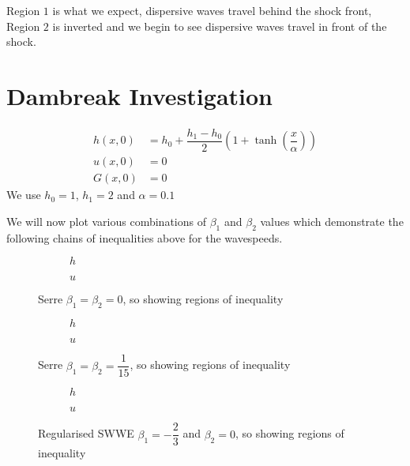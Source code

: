 \documentclass[10pt]{article}
\begin{document}
Region $1$ is what we expect, dispersive waves travel behind the shock front, Region $2$ is inverted and we begin to see dispersive waves travel in front of the shock. 




\section{Dambreak Investigation}


\begin{align}
h(x,0) & = h_0 + \dfrac{h_1 - h_0}{2} \left(1 + \tanh\left(\dfrac{x}{\alpha}\right)\right)  \\
u(x,0) &= 0 \\
G(x,0) &= 0
\end{align}
We use $h_0 = 1$, $h_1 = 2$ and $\alpha = 0.1$

We will now plot various combinations of $\beta_1$ and $\beta_2$ values which demonstrate the following chains of inequalities above for the wavespeeds. 

 
\begin{figure}
	\centering
	\begin{subfigure}{0.49\textwidth}
		\centering
		
		\caption{$h$}
	\end{subfigure}
	\begin{subfigure}{0.49\textwidth}
		\centering
		
		\caption{$u$}
	\end{subfigure}
	\caption{ Serre $\beta_1 = \beta_2 = 0$, so  showing regions of inequality}
\end{figure}

\begin{figure}
	\centering
	\begin{subfigure}{0.49\textwidth}
		\centering
		
		\caption{$h$}
	\end{subfigure}
	\begin{subfigure}{0.49\textwidth}
		\centering
		
		\caption{$u$}
	\end{subfigure}
	\caption{ Serre $\beta_1 = \beta_2 = \dfrac{1}{15}$, so  showing regions of inequality}
\end{figure}

\begin{figure}
	\centering
	\begin{subfigure}{0.49\textwidth}
		\centering
		
		\caption{$h$}
	\end{subfigure}
	\begin{subfigure}{0.49\textwidth}
		\centering
		
		\caption{$u$}
	\end{subfigure}
	\caption{Regularised SWWE $\beta_1 = -\dfrac{2}{3} $ and $\beta_2 = 0$, so  showing regions of inequality}
\end{figure}
\end{document}
